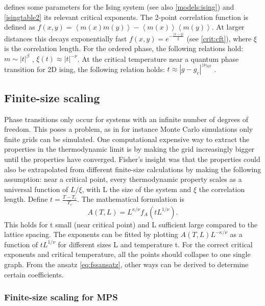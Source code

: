  defines some parameters for the Ising system (see also \cref{models:ising}) and \cref{isingtable2} its relevant critical  exponents. The 2-point correlation function is defined as $ f( x,y) =  \left < m(x) m(y) \right > -  \left<m(x) \right> \left<m(y) \right> $. At larger distances this decays exponentially fast $ f(  x,y ) = e^{ -\frac{ |x-y|}{ \xi} } $ (see \cref{crit:cft}), where $\xi$ is the correlation length. For the ordered phase, the following relations hold: $m \sim |t|^{\beta} $ , $\xi(t) \approx |t|^{-\nu} $\cite{Odor2004}.  At the critical temperature near a quantum phase transition for 2D ising, the following relation holds: $ t \approx |g-g_c|^{z \nu_{3D}} $ \cite{Hesselmann2016}.

\subsection{Finite-size scaling}\label{subsec:fss}

Phase transitions only occur for systems with an infinite number of degrees of freedom. \cite{Kadanoff2010} This poses a problem, as in for instance Monte Carlo simulations only finite grids can be simulated. One computational expensive way to extract the properties in the thermodynamic limit is by making the grid increasingly bigger until the properties have converged. Fisher's  insight was that the properties could also be extrapolated from different finite-size calculations \cite{Fisher1967} by making the following assumption: near a critical point, every thermodynamic property scales as a universal function of $L/\xi$, with L the size of the system and $\xi$ the correlation length.
Define $t=\frac{T-T_c}{T_c}$. The mathematical formulation is \cite{Beach2005}
\begin{equation}\label{eq:fssansatz}
    A(T,L) = L^{\kappa / \nu} f_A( t L ^{1/ \nu} ).
\end{equation}
This holds for t small (near critical point) and L sufficient large compared to the lattice spacing. The exponents can be fitted by plotting $A(T,L)  L^{-\kappa / \nu} $ as a function of $t L ^{1/ \nu}$ for different sizes L and temperature t. For the correct critical exponents and critical temperature, all the points should collapse to one single graph. From the ansatz \cref{eq:fssansatz}, other ways can be derived to determine certain coefficients.

\subsubsection{Finite-size scaling for MPS}

